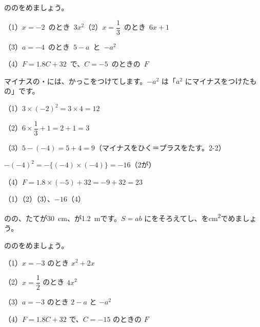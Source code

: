 \begin{reidai}
ののをめましょう。\par
\mbox{（1）$x=-2$ のとき $3x^2$}\quad\mbox{（2）$x=\dfrac{1}{3}$ のとき $6x+1$}\par
\mbox{（3）$a=-4$ のとき $5-a$ と $-a^2$}\par
\mbox{（4）$F=1.8C+32$ で、$C=-5$ のときの $F$}\par
\kangaekata マイナスの・には、かっこをつけてします。$-a^2$ は「$a^2$ にマイナスをつけたもの」です。\par
\shiki（1）$3\times(-2)^2=3\times4=12$\par
\hspace*{2.6\zw}（2）$6\times\dfrac{1}{3}+1=2+1=3$\par
\hspace*{2.6\zw}（3）$5-(-4)=5+4=9$\quad（マイナスをひく＝プラスをたす。2-2）\par
\hspace*{4.6\zw}$-(-4)^2=-\{(-4)\times(-4)\}=-16$\quad（2が）\par
\hspace*{2.6\zw}（4）$F=1.8\times(-5)+32=-9+32=23$\par
\kotae（1）\quad（2）\quad（3）、$-16$\quad（4）
\end{reidai}

\begingroup{}%
\noindent\begin{minipage}[t]{0.49\linewidth}
\begin{jibun}
のの、たてが\qty{30}{cm}、が\qty{1.2}{m}です。$S=ab$ にをそろえてし、を\unit{cm^2}でめましょう。
\end{jibun}
\end{minipage}\hfill
\begin{minipage}[t]{0.49\linewidth}
\begin{jibun}
ののをめましょう。\par
（1）\nobreak $x=-3$ のとき $x^2+2x$\par
（2）\nobreak $x=\dfrac{1}{2}$ のとき $4x^2$\par
（3）\nobreak $a=-3$ のとき $2-a$ と $-a^2$\par
（4）\nobreak $F=1.8C+32$ で、$C=-15$ のときの $F$
\end{jibun}
\end{minipage}\par
\endgroup

